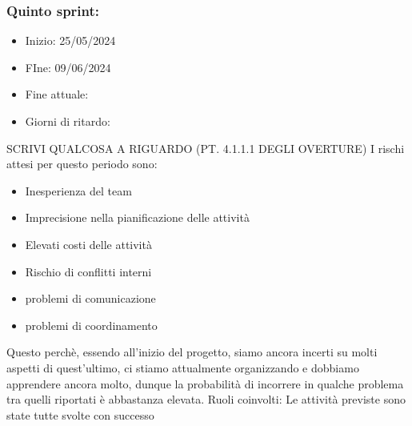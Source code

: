 \documentclass[italian,12pt]{article} %
\begin{document}
    \subsubsection{Quinto sprint:}
    \begin{itemize}
        \item Inizio: 25/05/2024
        \item FIne: 09/06/2024
        \item Fine attuale:
        \item Giorni di ritardo:
    \end{itemize}
    SCRIVI QUALCOSA A RIGUARDO (PT. 4.1.1.1 DEGLI OVERTURE)
    I rischi attesi per questo periodo sono:
    \begin{itemize}
        \item Inesperienza del team
        \item Imprecisione nella pianificazione delle attività
        \item Elevati costi delle attività
        \item Rischio di conflitti interni 
        \item problemi di comunicazione
        \item problemi di coordinamento
    \end{itemize}
    Questo perchè, essendo all’inizio del progetto, siamo ancora incerti su molti aspetti di quest’ultimo, ci stiamo attualmente organizzando e dobbiamo apprendere ancora molto, dunque la probabilità di incorrere in qualche problema tra quelli riportati è abbastanza elevata.
    Ruoli coinvolti: 
    Le attività previste sono state tutte svolte con successo
\end{document}
